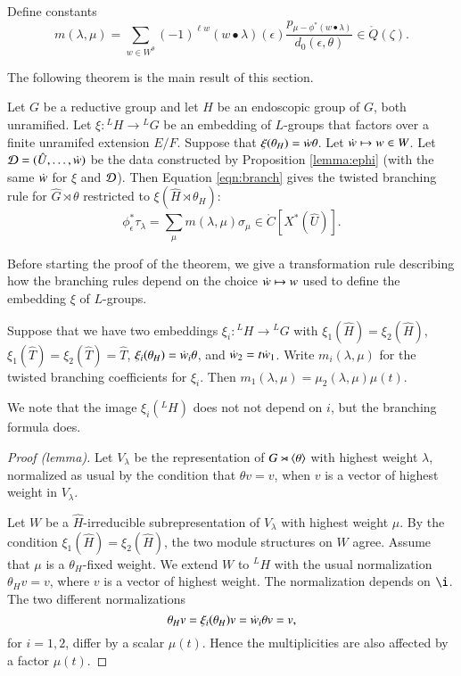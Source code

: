 Define constants 
\begin{equation}\label{eqn:branch}
m(\lambda,\mu) = \sum_{w\in W^\theta} 
(-1)^{\ell w} ({w\bullet\lambda})(\epsilon)
\frac{p_{\mu-\phi^*(w\bullet\lambda)}}{d_0(\epsilon,\theta)} \in \ring{Q}(\zeta).
\end{equation}

The following theorem is the main result of this section.

\begin{theorem}\label{thm:branch}
  Let $G$ be a reductive group and let $H$ be an endoscopic group of
  $G$, both unramified.  Let $\xi:{}^LH\to {}^LG$ be an embedding of
  $L$-groups that factors over a finite unramifed extension $E/F$.
  Suppose that $\xi(\theta_H) = \dot w\theta$.  Let $\dot w\mapsto w\in W$.
  Let $\mathcal D=(\hat U,\ldots,\dot w)$ be the data constructed by
  Proposition \ref{lemma:ephi} (with the same $\dot w$ for $\xi$ and $\mathcal D$).  
  Then Equation \ref{eqn:branch} gives
  the twisted branching rule for $\hat G\rtimes \theta$ restricted to
  $\xi(\hat H\rtimes \theta_H)$:
\[
\phi^*_\epsilon\tau_\lambda = \sum_\mu m(\lambda,\mu) \sigma_\mu \in
\ring{C}[X^*(\hat U)].
\]
\end{theorem}

Before starting the proof of the theorem, we give a transformation rule
describing how the branching
rules depend on the choice $\dot w\mapsto w$ 
used to define the embedding $\xi$ of $L$-groups.  


\begin{lemma}\label{lemma:transform}
Suppose that we have two embeddings $\xi_i:{}^LH\to {}^LG$ with
$\xi_1(\hat H) =\xi_2(\hat H)$, $\xi_1(\hat T) = \xi_2(\hat T) = \hat T$, 
$\xi_i(\theta_H) = \dot w_i\theta$, and $\dot w_2 = t\dot w_1$.
Write $m_i(\lambda,\mu)$ for the twisted branching coefficients for $\xi_i$.
Then $m_1(\lambda,\mu) = \mu_2(\lambda,\mu)\mu(t)$.
\end{lemma}

We note that the image $\xi_i({}^LH)$ does not not depend on 
$i$, but the branching formula does.

\begin{proof}[Proof (lemma)]  
Let $V_\lambda$ be the representation of $G\rtimes \langle{\theta}\rangle$ with
highest weight $\lambda$, normalized as usual by the condition that $\theta v=v$,
when $v$ is a vector of highest weight in $V_\lambda$.

Let $W$ be a $\hat H$-irreducible subrepresentation of $V_\lambda$
with highest weight $\mu$.  By the condition
$\xi_1(\hat H) =\xi_2(\hat H)$, the two module structures on $W$
agree.  Assume that $\mu$ is a $\theta_H$-fixed weight.  We extend $W$
to ${}^LH$ with the usual normalization $\theta_H v = v$, where $v$ is
a vector of highest weight.  The normalization depends on $\i$.
The two different normalizations
\[
\theta_H v = \xi_i(\theta_H) v = \dot w_i \theta v =v,
\]
for $i=1,2$, 
differ by a scalar $\mu(t)$.  
Hence the multiplicities are also affected by a factor $\mu(t)$.
\end{proof}

